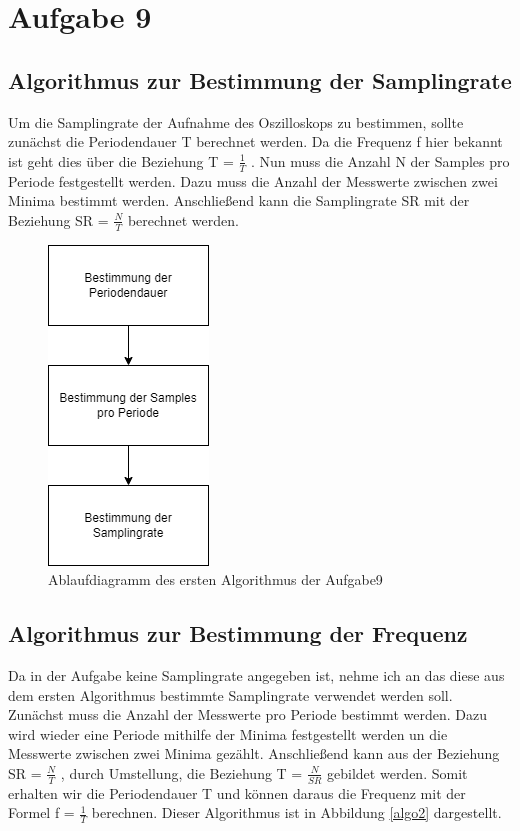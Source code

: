 \chapter{Aufgabe 9}
\section{Algorithmus zur Bestimmung der Samplingrate}
Um die Samplingrate der Aufnahme des Oszilloskops zu bestimmen, sollte zunächst die Periodendauer T berechnet werden.
Da die Frequenz f hier bekannt ist geht dies über die Beziehung T = $\frac{1}{T}$ .
Nun muss die Anzahl N der Samples pro Periode festgestellt werden.
Dazu muss die Anzahl der Messwerte zwischen zwei Minima bestimmt werden.
Anschließend kann die Samplingrate SR mit der Beziehung SR = $\frac{N}{T}$ berechnet werden.\par 

\begin{figure}
	\centering
	\includegraphics[scale=0.5]{Images/aufgabe9_algo1.png}
	\caption{Ablaufdiagramm des ersten Algorithmus der Aufgabe9}
	\label{algo1}
\end{figure}

\section{Algorithmus zur Bestimmung der Frequenz}
Da in der Aufgabe keine Samplingrate angegeben ist, nehme ich an das diese aus dem ersten Algorithmus bestimmte Samplingrate verwendet werden soll.
Zunächst muss die Anzahl der Messwerte pro Periode bestimmt werden. 
Dazu wird wieder eine Periode mithilfe der Minima festgestellt werden un die Messwerte zwischen zwei Minima gezählt. 
Anschließend kann aus der Beziehung SR = $\frac{N}{T}$ , durch Umstellung, die Beziehung T = $\frac{N}{SR}$ gebildet werden. 
Somit erhalten wir die Periodendauer T und können daraus die Frequenz mit der Formel f = $\frac {1}{T}$ berechnen.
Dieser Algorithmus ist in Abbildung \ref{algo2} dargestellt.\par

